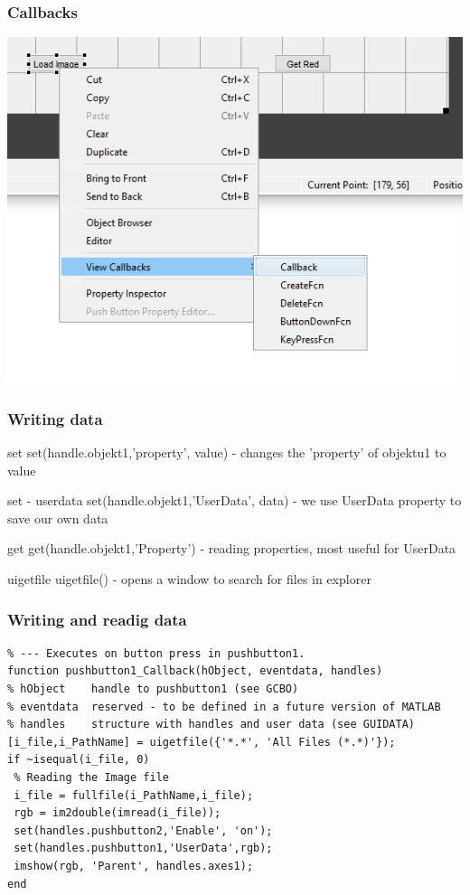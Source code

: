 \documentclass{beamer}
\begin{document}
\begin{frame}
  \frametitle{Callbacks}
  \centering
  \includegraphics[width=\textwidth, height=0.8\textheight,keepaspectratio]{screens/callbacks.png}
\end{frame}

\begin{frame}
  \frametitle{Writing data}
  \begin{block}{set}
  set(handle.objekt1,'property', value) - changes the 'property' of objektu1 to value
 \end{block}
 
   \begin{block}{set - userdata}
  set(handle.objekt1,'UserData', data) - we use UserData property to save our own data
 \end{block}
 
   \begin{block}{get}
  get(handle.objekt1,'Property') - reading properties, most useful for UserData
 \end{block}

   \begin{block}{uigetfile}
  uigetfile() - opens a window to search for files in explorer
 \end{block}
\end{frame}

\begin{frame}[fragile]
  \frametitle{Writing and readig data}
  \begin{verbatim}
% --- Executes on button press in pushbutton1.
function pushbutton1_Callback(hObject, eventdata, handles)
% hObject    handle to pushbutton1 (see GCBO)
% eventdata  reserved - to be defined in a future version of MATLAB
% handles    structure with handles and user data (see GUIDATA)
[i_file,i_PathName] = uigetfile({'*.*', 'All Files (*.*)'});
if ~isequal(i_file, 0)
 % Reading the Image file
 i_file = fullfile(i_PathName,i_file);
 rgb = im2double(imread(i_file));
 set(handles.pushbutton2,'Enable', 'on');
 set(handles.pushbutton1,'UserData',rgb);
 imshow(rgb, 'Parent', handles.axes1);
end \end{verbatim}
\end{frame}
\end{document}
